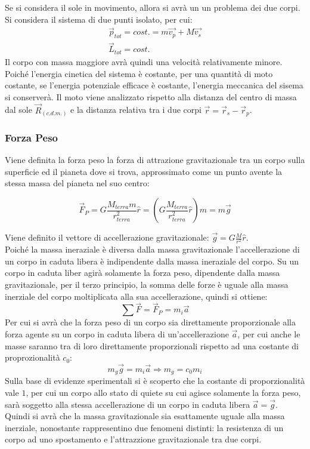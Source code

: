 \documentclass{article}
\numberwithin{equation}{subsection}
\begin{document}
Se si considera il sole in movimento, allora si avrà un un problema dei due corpi. Si considera il sistema di due punti isolato, per cui:
\begin{gather}
    \vec{p}_{tot}=cost.=m\vec{v_p}+M\vec{v_s}\\
    \vec{L}_{tot}=cost.
\end{gather}
Il corpo con massa maggiore avrà quindi una velocità relativamente minore. Poiché l'energia cinetica del sistema è costante, per una quantità di moto costante, 
se l'energia potenziale efficace è costante, l'energia meccanica del sisema si conserverà. Il moto viene analizzato rispetto alla distanza 
del centro di massa dal sole $\vec{R}_{(c.d.m.)}$ e la distanza relativa tra i due corpi $\vec{r}=\vec{r}_s-\vec{r}_p$. 

\subsubsection{Forza Peso}

Viene definita la forza peso la forza di attrazione gravitazionale tra un
corpo sulla superficie ed il pianeta dove si trova, approssimato 
come un punto avente la stessa massa del pianeta nel suo centro:

\begin{equation}
    \vec{F}_P=G\displaystyle\frac{M_{terra}m}{r_{terra}^{2}}\hat{r}=\left(G\frac{M_{terra}}{r_{terra}^{2}}\hat{r}\right)m=m\vec{g}
\end{equation}

Viene definito il vettore di accellerazione gravitazionale: 
$\vec{g}=G\displaystyle\frac{M}{r^{2}}\hat{r}$.\\
Poiché la massa ineraziale è diversa dalla massa gravitazionale 
l'accellerazione di un corpo in caduta libera è indipendente 
dalla massa ineraziale del corpo. Su un corpo in caduta liber agirà solamente la forza peso, dipendente dalla massa gravitazionale, per il terzo 
principio, la somma delle forze è uguale alla massa inerziale del corpo moltiplicata alla sua accellerazione, quindi si ottiene: 
\begin{equation}
    \sum\vec{F}=\vec{F}_P=m_i\vec{a}
\end{equation}
Per cui si avrà che la forza peso di un corpo sia direttamente proporzionale alla forza agente su un corpo in caduta libera di un'accellerazione $\vec{a}$, 
per cui anche le masse saranno tra di loro direttamente proporzionali rispetto ad una costante di proprozionalità $c_0$:
\begin{equation}
    m_g\vec{g}=m_i\vec{a}\Rightarrow m_g=c_0m_i
\end{equation}
Sulla base di evidenze sperimentali si è scoperto che la costante di proporzionalità vale $1$, per cui un corpo allo stato di quiete su cui agisce 
solamente la forza peso, sarà soggetto alla stessa accellerazione di un corpo in caduta libera $\vec{a}=\vec{g}$. Quindi si avrà che la massa gravitazionale sia 
esattamente uguale alla massa inerziale, nonostante rappresentino due fenomeni distinti: la resistenza di un corpo ad uno spostamento e 
l'attrazzione gravitazionale tra due corpi.\\
\end{document}
